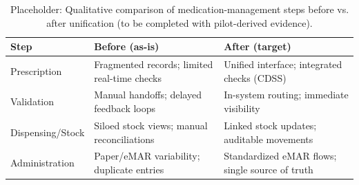 \begin{table}[H]
    \centering
    \caption{Placeholder: Qualitative comparison of medication-management steps before vs. after unification (to be completed with pilot-derived evidence).}
    \label{tab:before_after_qualitative}
    \begin{tabularx}{\textwidth}{@{}l|Y|Y@{}}
        \toprule
        \textbf{Step} & \textbf{Before (as-is)} & \textbf{After (target)} \\
        \midrule
        Prescription & Fragmented records; limited real-time checks & Unified interface; integrated checks (CDSS) \\
        Validation & Manual handoffs; delayed feedback loops & In-system routing; immediate visibility \\
        Dispensing/Stock & Siloed stock views; manual reconciliations & Linked stock updates; auditable movements \\
        Administration & Paper/eMAR variability; duplicate entries & Standardized eMAR flows; single source of truth \\
        \bottomrule
    \end{tabularx}
\end{table}


